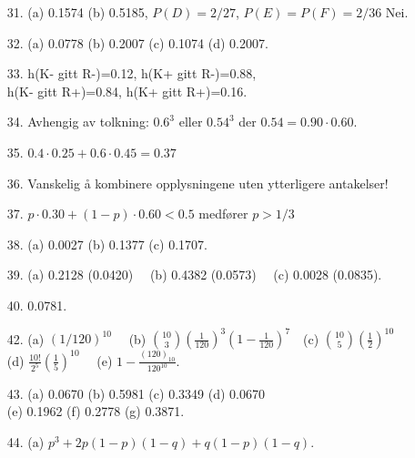 \begin{itemize}
\item[31.]  (a)  0.1574   (b)  0.5185, $P(D)=2/27$, $P(E)=P(F)=2/36$  Nei.
\item[32.]  (a)  0.0778   (b)  0.2007   (c)  0.1074   (d)  0.2007.
\item[33.]  h(K- gitt R-)=0.12, h(K+ gitt R-)=0.88, \\
            h(K- gitt R+)=0.84, h(K+ gitt R+)=0.16. 
\item[34.]  Avhengig av tolkning: $0.6^{3}$ eller $0.54^{3}$ der
            $0.54=0.90\cdot 0.60$.
\item[35.]  $0.4\cdot 0.25 + 0.6 \cdot 0.45 = 0.37$
\item[36.]  Vanskelig å kombinere opplysningene uten ytterligere antakelser!
\item[37.]  $p\cdot 0.30 + (1-p) \cdot 0.60 < 0.5$ medfører $p>1/3$
\item[38.]  (a)  0.0027   (b)  0.1377   (c)  0.1707.
\item[39.]  (a)  0.2128 (0.0420) \ \  (b)  0.4382 (0.0573) \ \
            (c)  0.0028 (0.0835).
\item[40.]  0.0781.
\item[42.]  (a)  $(1/120)^{10}$     \ \
            (b) ${10\choose 3} (\frac{1}{120})^3 (1-\frac{1}{120})^7$\ \
            (c) ${10\choose 5} (\frac{1}{2})^{10}$\\
            (d) $\frac{10!}{2^5}(\frac{1}{5})^{10}$ \ \
            (e) $1-\frac{(120)_{10}}{120^{10}}$.
\item[43.]  (a)  0.0670   (b)  0.5981   (c)  0.3349   (d)  0.0670\\
            (e)  0.1962   (f)  0.2778   (g)  0.3871.
\item[44.]  (a)  $p^3+2p(1-p)(1-q)+q(1-p)(1-q)$.
\end{itemize}         
         
